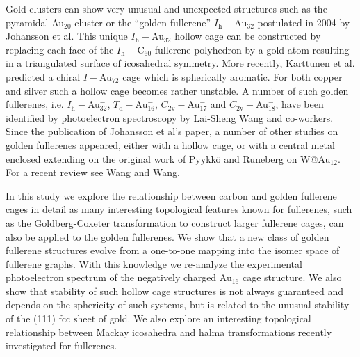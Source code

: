 Gold clusters can show very unusual and unexpected structures such as the
pyramidal Au$_{20}$
cluster\autocite{Li-2003,Fielicke-2008,Assadollahzadeh_systematicsearchminimum_2009}
or the ``golden fullerene'' $I_\mathrm{h}-$Au$_{32}$ postulated in 2004 by Johansson et
al.\autocite{Johansson_Au3224CaratGolden_2004} This unique $I_\mathrm{h}-$Au$_{32}$
hollow cage can be constructed by replacing each face of the $I_\mathrm{h}-$C$_{60}$
fullerene polyhedron by a gold atom resulting in a triangulated surface of
icosahedral symmetry.\autocite{Johansson_Au3224CaratGolden_2004} More recently,
Karttunen et al. predicted a chiral $I-$Au$_{72}$ cage which is spherically
aromatic.\autocite{Karttunen_IcosahedralAu72_2008} For both copper and silver
such a hollow cage becomes rather
unstable.\autocite{Johansson_Au3224CaratGolden_2004,FERNANDEZ_DENSITYFUNCTIONALSTUDIES_2006} A number
of such golden fullerenes, i.e. $I_\mathrm{h}-$Au$_{32}^-$, $T_\mathrm{d}-$Au$_{16}^-$,
$C_\mathrm{2v}-$Au$_\mathrm{17}^-$ and $C_\mathrm{2v}-$Au$_{18}^-$, have been identified by
photoelectron spectroscopy by Lai-Sheng Wang and
co-workers.\autocite{Ji-2005,Bulusu_Evidencehollowgolden_2006} Since the
publication of Johansson et al's
paper\autocite{Johansson_Au3224CaratGolden_2004}, a number of other studies on
golden fullerenes appeared, either with a hollow
cage,\autocite{Gu-2004,Fernandez-2006,Fa-Dong-2006,Fa-Zhou-2006,Karttunen_IcosahedralAu72_2008,Fa-Luong-2008,Chen_Structuresneutralanionic_2010,Tian-2011,De-2012,Ning-2014,Joshi-2015}
or with a central metal
enclosed\autocite{Autschbach_PropertiesWAu12_2004,Zhai-2004,Gao-Bulusu-2005,Wang_Dopinggoldencage_2007,Wang_DopingGoldenBuckyballs_2007,Fa-Dong-2008a,Munoz-2013,Manna-2013,Tang-2013}
extending on the original work of Pyykk\"o and Runeberg on
W@Au$_{12}$.\autocite{Pyykko_IcosahedralWAu12Predicted_2002,Li_Experimentalobservationconfirmation_2002}
For a recent review see Wang and Wang.\autocite{Wang-Wang-2012}

In this study we explore the relationship between carbon and golden fullerene
cages in detail as many interesting topological features known for
fullerenes,\autocite{Cataldo-Ori-2011,Schwerdtfeger_topologyfullerenes_2015}
such as the Goldberg-Coxeter transformation to construct larger fullerene
cages,\autocite{Goldberg_ClassMultiSymmetricPolyhedra_1937,Coxeter-1971} can
also be applied to the golden fullerenes. We show that a new class of golden
fullerene structures evolve from a one-to-one mapping into the isomer space of
fullerene graphs. With this knowledge we re-analyze the experimental
photoelectron spectrum of the negatively charged Au$_{16}^-$ cage structure. We
also show that stability of such hollow cage structures is not always
guaranteed and depends on the sphericity of such systems, but is related to the
unusual stability of the (111) fcc sheet of gold. We also explore an
interesting topological relationship between Mackay icosahedra and halma
transformations recently investigated for
fullerenes.\autocite{Schwerdtfeger_topologyfullerenes_2015}

